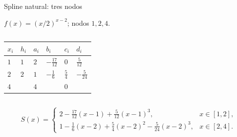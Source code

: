 \documentclass[main.tex]{subfiles}
\begin{document}
\begin{frame}[t]{Spline natural: tres nodos}
\par\noindent\begin{minipage}[t][9mm][t]{\textwidth}\small\strut $f(x)=(x/2)^{x-2}$; nodos $1,2,4$.\end{minipage}\par\nointerlineskip
\begin{columns}[T]\begin{minipage}[t]{\textwidth}\begingroup\scriptsize\setlength{\tabcolsep}{2pt}\begin{center}\begin{tabular}{|C{.12\textwidth}|C{.12\textwidth}|C{.12\textwidth}|C{.12\textwidth}|C{.12\textwidth}|C{.12\textwidth}|}\hline
\rule[-2mm]{0pt}{6mm}$x_i$&$h_i$&$a_i$&$b_i$&$c_i$&$d_i$\\\hline
\rule[-2.5mm]{0pt}{7mm}$1$&$1$&$2$&$-\frac{17}{12}$&$0$&$\frac{5}{12}$\\\hline
\rule[-2.5mm]{0pt}{7mm}$2$&$2$&$1$&$-\frac{1}{6}$&$\frac{5}{4}$&$-\frac{5}{24}$\\\hline
\rule[-2.5mm]{0pt}{7mm}$4$&&$4$&&$0$&\\\hline
\end{tabular}\end{center}\endgroup\end{minipage}\par
\end{columns}\small
\[S(x)=\begin{cases}
2-\frac{17}{12}(x-1)+\frac5{12}(x-1)^3,&x\in[1,2],\\[2mm]
1-\frac16(x-2)+\frac54(x-2)^2-\frac5{24}(x-2)^3,&x\in[2,4].
\end{cases}\]
\end{frame}
\end{document}
